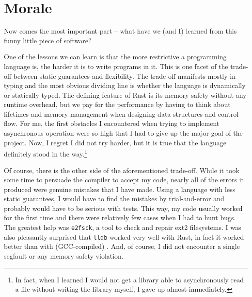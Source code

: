 \chapter{Morale}

Now comes the most important part -- what have we (and I) learned from this
funny little piece of software? 

One of the lessons we can learn is that the more restrictive a programming
language is, the harder it is to write programs in it. This is one facet of the
trade-off between static guarantees and flexibility. The trade-off manifests
mostly in typing and the most obvious dividing line is whether the language is
dynamically or statically typed. The defining feature of Rust is its memory
safety without any runtime overhead, but we pay for the performance by having to
think about lifetimes and memory management when designing data structures and
control flow. For me, the first obstacles I encountered when trying to implement
asynchronous operation were so high that I had to give up the major goal of the
project. Now, I regret I did not try harder, but it is true that the language
definitely stood in the way.\footnote{In fact, when I learned I would not get a
library able to asynchronously read a file without writing the library myself, I
gave up almost immediately.}

Of course, there is the other side of the aforementioned trade-off. While it
took some time to persuade the compiler to accept my code, nearly all of the
errors it produced were genuine mistakes that I have made. Using a language with
less static guarantees, I would have to find the mistakes by trial-and-error and
probably would have to be serious with tests. This way, my code usually worked
for the first time and there were relatively few cases when I had to hunt bugs.
The greatest help was \texttt{e2fsck}, a tool to check and repair ext2
filesystems. I was also pleasantly surprised that \texttt{lldb} worked very
well with Rust, in fact it worked better than with (GCC-compiled) \Cplusplus{}.
And, of course, I did not encounter a single segfault or any memory safety
violation.
